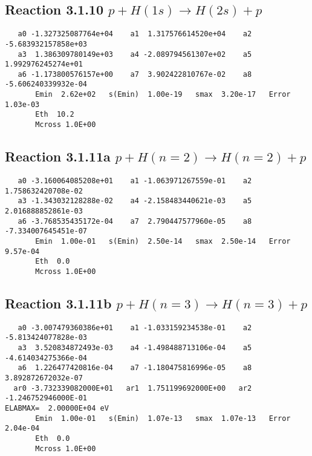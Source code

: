 \documentclass[12pt,dvipdfm]{article}
\begin{document}
\newpage
\subsection{
Reaction 3.1.10 $   p + H(1s) \rightarrow H(2s) + p$}


\begin{small}\begin{verbatim}
   a0 -1.327325087764e+04    a1  1.317576614520e+04    a2 -5.683932157858e+03
   a3  1.386309780149e+03    a4 -2.089794561307e+02    a5  1.992976245274e+01
   a6 -1.173800576157e+00    a7  3.902422810767e-02    a8 -5.606240339932e-04
       Emin  2.62e+02   s(Emin)  1.00e-19   smax  3.20e-17   Error  1.03e-03
       Eth  10.2
       Mcross 1.0E+00
\end{verbatim}\end{small}


\newpage
\subsection{
Reaction 3.1.11a $   p + H(n=2) \rightarrow H(n=2) + p$}


\begin{small}\begin{verbatim}
   a0 -3.160064085208e+01    a1 -1.063971267559e-01    a2  1.758632420708e-02
   a3 -1.343032128288e-02    a4 -2.158483440621e-03    a5  2.016888852861e-03
   a6 -3.768535435172e-04    a7  2.790447577960e-05    a8 -7.334007645451e-07
       Emin  1.00e-01   s(Emin)  2.50e-14   smax  2.50e-14   Error  9.57e-04
       Eth  0.0
       Mcross 1.0E+00
\end{verbatim}\end{small}


\newpage
\subsection{
Reaction 3.1.11b $p + H(n=3) \rightarrow H(n=3) + p$}















\begin{small}\begin{verbatim}
   a0 -3.007479360386e+01    a1 -1.033159234538e-01    a2 -5.813424077828e-03
   a3  3.520834872493e-03    a4 -1.498488713106e-04    a5 -4.614034275366e-04
   a6  1.226477420816e-04    a7 -1.180475816996e-05    a8  3.892872672032e-07
  ar0 -3.732339082000E+01   ar1  1.751199692000E+00   ar2 -1.246752946000E-01
ELABMAX=  2.00000E+04 eV
       Emin  1.00e-01   s(Emin)  1.07e-13   smax  1.07e-13   Error  2.04e-04
       Eth  0.0
       Mcross 1.0E+00
\end{verbatim}\end{small}
\end{document}
